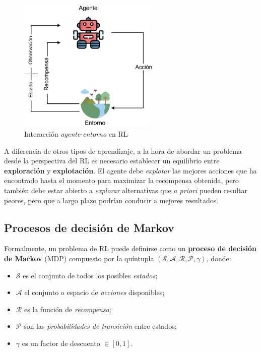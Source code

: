 \begin{figure}
    \centering
    \includegraphics[width=0.6\textwidth]{imagenes/rl-components.pdf}
    \caption{Interacción \textit{agente}-\textit{entorno} en RL}
    \label{fig:rl-model}
\end{figure}

A diferencia de otros tipos de aprendizaje, a la hora de abordar un problema desde la perspectiva del RL es necesario establecer un equilibrio entre \textbf{exploración} y \textbf{explotación}. El agente debe \textit{explotar} las mejores acciones que ha encontrado hasta el momento para maximizar la recompensa obtenida, pero también debe estar abierto a \textit{explorar} alternativas que \textit{a priori} pueden resultar peores, pero que a largo plazo podrían conducir a mejores resultados.

\subsection{Procesos de decisión de Markov}

Formalmente, un problema de RL puede definirse como un \textbf{proceso de decisión de Markov} (MDP) compuesto por la quíntupla $(\mathcal{S}, \mathcal{A}, \mathcal{R}, \mathcal{P}, \gamma)$, donde:

\begin{itemize}
    \item $\mathcal{S}$ es el conjunto de todos los posibles \textit{estados};
    \item $\mathcal{A}$ el conjunto o espacio de \textit{acciones} disponibles;
    \item $\mathcal{R}$ es la función de \textit{recompensa};
    \item $\mathcal{P}$ son las \textit{probabilidades de transición} entre estados;
    \item $\gamma$ es un factor de descuento $\in [0, 1]$.
\end{itemize}

